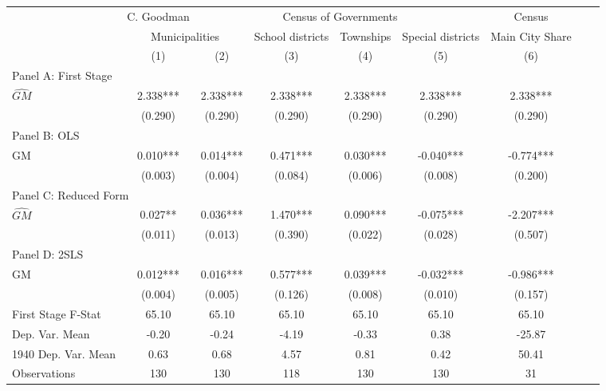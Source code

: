  \begin{tabular}{l*{8}{c}} \toprule
&\multicolumn{1}{c}{C. Goodman}&\multicolumn{4}{c}{Census of Governments}&\multicolumn{1}{c}{Census}\\\cmidrule(lr){2-2}\cmidrule(lr){3-6}\cmidrule(lr){7-7}
&\multicolumn{2}{c}{Municipalities}&\multicolumn{1}{c}{School districts}&\multicolumn{1}{c}{Townships}&\multicolumn{1}{c}{Special districts}&\multicolumn{1}{c}{Main City Share}\\\cmidrule(lr){2-3}\cmidrule(lr){4-6}\cmidrule(lr){7-7}
&\multicolumn{1}{c}{(1)}&\multicolumn{1}{c}{(2)}&\multicolumn{1}{c}{(3)}&\multicolumn{1}{c}{(4)}&\multicolumn{1}{c}{(5)}&\multicolumn{1}{c}{(6)}\\
\cmidrule(lr){1-7}
\multicolumn{6}{l}{Panel A: First Stage}\\
\cmidrule(lr){1-7}
$\widehat{GM}$  &    2.338***&    2.338***&    2.338***&    2.338***&    2.338***&    2.338***\\
                &  (0.290)   &  (0.290)   &  (0.290)   &  (0.290)   &  (0.290)   &  (0.290)   \\
\cmidrule(lr){1-7}
\multicolumn{6}{l}{Panel B: OLS}\\
\cmidrule(lr){1-7}
GM              &    0.010***&    0.014***&    0.471***&    0.030***&   -0.040***&   -0.774***\\
                &  (0.003)   &  (0.004)   &  (0.084)   &  (0.006)   &  (0.008)   &  (0.200)   \\
\cmidrule(lr){1-7}
\multicolumn{6}{l}{Panel C: Reduced Form}\\
\cmidrule(lr){1-7}
$\widehat{GM}$  &    0.027** &    0.036***&    1.470***&    0.090***&   -0.075***&   -2.207***\\
                &  (0.011)   &  (0.013)   &  (0.390)   &  (0.022)   &  (0.028)   &  (0.507)   \\
\cmidrule(lr){1-7}
\multicolumn{6}{l}{Panel D: 2SLS}\\
\cmidrule(lr){1-7}
GM              &    0.012***&    0.016***&    0.577***&    0.039***&   -0.032***&   -0.986***\\
                &  (0.004)   &  (0.005)   &  (0.126)   &  (0.008)   &  (0.010)   &  (0.157)   \\
\midrule
First Stage F-Stat&    65.10   &    65.10   &    65.10   &    65.10   &    65.10   &    65.10   \\
Dep. Var. Mean  &    -0.20   &    -0.24   &    -4.19   &    -0.33   &     0.38   &   -25.87   \\
1940 Dep. Var. Mean&     0.63   &     0.68   &     4.57   &     0.81   &     0.42   &    50.41   \\
Observations    &      130   &      130   &      118   &      130   &      130   &       31   \\
       \bottomrule \end{tabular}
